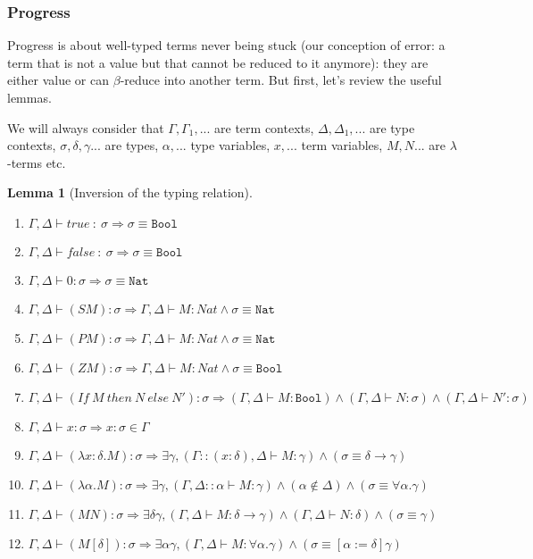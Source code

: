 \documentclass{article}
\newtheorem{lemma}[theorem]{Lemma}
\begin{document}
    \subsubsection{Progress}
    Progress is about well-typed terms never being stuck (our conception of error: a term that is not a value but that cannot be reduced to it anymore): they are either value or can $\beta$-reduce into another term. But first, let's review the useful lemmas. \par We will always consider that $\Gamma, \Gamma_1, ...$ are term contexts, $\Delta, \Delta_1,...$ are type contexts, $\sigma, \delta, \gamma ...$ are types, $\alpha, ...$ type variables, $x, ...$ term variables, $M, N...$ are $\lambda$-terms etc.
    \begin{lemma}[Inversion of the typing relation]
    \end{lemma}
    \label{inversion}\begin{enumerate}
        \item $\Gamma,\Delta \vdash true \ : \ \sigma \Rightarrow \sigma \equiv \texttt{Bool}$
        \item $\Gamma,\Delta \vdash false \ : \ \sigma \Rightarrow \sigma \equiv \texttt{Bool}$
        \item $\Gamma,\Delta \vdash 0 : \sigma \Rightarrow \sigma \equiv \texttt{Nat}$
        \item $\Gamma,\Delta \vdash (S M):\sigma \Rightarrow \Gamma,\Delta \vdash M:Nat \wedge \sigma \equiv \texttt{Nat}$
        \item $\Gamma,\Delta \vdash (P M):\sigma \Rightarrow \Gamma,\Delta \vdash M:Nat \wedge \sigma \equiv \texttt{Nat}$
        \item $\Gamma,\Delta \vdash (Z M):\sigma \Rightarrow \Gamma,\Delta \vdash M:Nat \wedge \sigma \equiv \texttt{Bool}$
        \item $\Gamma,\Delta \vdash (If \ M \ then \ N \ else \ N'):\sigma \Rightarrow (\Gamma,\Delta \vdash M:\texttt{Bool}) \wedge (\Gamma,\Delta \vdash N:\sigma) \wedge (\Gamma,\Delta \vdash N':\sigma)$
        \item $\Gamma,\Delta \vdash x:\sigma \Rightarrow x : \sigma \in \Gamma$
        \item $\Gamma,\Delta \vdash (\lambda x : \delta.M) :  \sigma \Rightarrow \exists \gamma, (\Gamma::(x : \delta),\Delta \vdash M : \gamma) \wedge (\sigma \equiv \delta \rightarrow \gamma)$
        \item $\Gamma,\Delta \vdash (\lambda \alpha.M):\sigma \Rightarrow \exists \gamma, (\Gamma,\Delta :: \alpha \vdash M:\gamma) \wedge (\alpha\not\in\Delta) \wedge (\sigma \equiv \forall \alpha. \gamma)$
        \item $\Gamma,\Delta \vdash (M N):\sigma \Rightarrow \exists \delta \gamma, (\Gamma,\Delta \vdash M : \delta \rightarrow \gamma) \wedge (\Gamma,\Delta \vdash N:\delta) \wedge (\sigma \equiv \gamma)$
        \item  $\Gamma,\Delta \vdash (M [\delta]):\sigma \Rightarrow \exists \alpha \gamma, (\Gamma,\Delta \vdash M : \forall \alpha. \gamma) \wedge (\sigma \equiv [\alpha := \delta]\gamma)$
    \end{enumerate}
\end{document}
